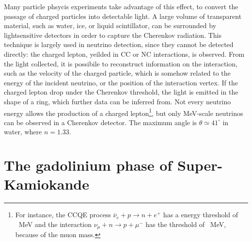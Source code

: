 Many particle phsycis experiments take advantage of this effect, to convert the passage of %
charged particles into detectable light.
A large volume of transparent material, such as water, ice, or liquid scintillator, can be %
surrounded by lightsensitive detectors in order to capture the Cherenkov radiation.
This technique is largely used in neutrino detection, since they cannot be detected directly: the charged lepton, %
yeilded in CC or NC interactions, is observed.
From the light collected, it is possibile to reconstruct information on the interaction, such as the velocity %
of the charged particle, which is somehow related to the energy of the incident neutrino, or the position %
of the interaction vertex.
If the charged lepton drop under the Cherenkov threshold, the light is emitted in the shape of a ring, which %
further data can be inferred from.
Not every neutrino energy allows the production of a charged lepton\footnote{For instance, the CCQE process %
	$\bar\nu_e+p\rightarrow n+e^+$ has a energy threshold of ~MeV and the interaction %
	$\nu_\mu+n\rightarrow p+\mu^-$ has the threshold of ~MeV, because of the muon mass.}, %
but only MeV-scale neutrinos can be observed in a Cherenkov detector.
The maximum angle is $\theta \simeq 41^\circ$ in water, where $n = 1.33$.

\section{The gadolinium phase of Super-Kamiokande}

